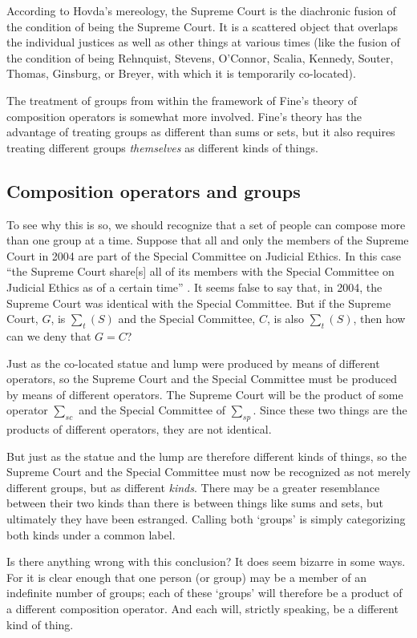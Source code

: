 \documentclass[11pt]{article}
\begin{document}
\begin{spacing}{1.5}
According to Hovda's mereology, the Supreme Court is the diachronic
fusion of the condition of being the Supreme Court.  It is a scattered
object that overlaps the individual justices as well as other things
at various times (like the fusion of the condition of being Rehnquist,
Stevens, O'Connor, Scalia, Kennedy, Souter, Thomas, Ginsburg, or
Breyer, with which it is temporarily co-located).

The treatment of groups from within the framework of Fine's theory of
composition operators is somewhat more involved.  Fine's theory has
the advantage of treating groups as different than sums or sets, but
it also requires treating different groups {\em themselves} as
different kinds of things.

\subsection{Composition operators and groups}
\label{group-fine}
To see why this is so, we should recognize that a set of people can
compose more than one group at a time.  Suppose that all and only the
members of the Supreme Court in 2004 are part of the Special Committee
on Judicial Ethics.  In this case ``the Supreme Court share[s] all of
its members with the Special Committee on Judicial Ethics as of a
certain time'' \citep[151]{uzquiano2004a}.  It seems false to say
that, in 2004, the Supreme Court was identical with the Special
Committee.  But if the Supreme Court, $G$, is $\sum _{t} ( S )$ and
the Special Committee, $C$, is also $\sum _{t} ( S )$, then how can we
deny that $G = C$?

Just as the co-located statue and lump were produced by means of
different operators, so the Supreme Court and the Special Committee
must be produced by means of different operators.  The Supreme Court
will be the product of some operator $\sum _{sc}$ and the Special
Committee of $\sum _{sp}$.  Since these two things are the products of
different operators, they are not identical.

But just as the statue and the lump are therefore different kinds of
things, so the Supreme Court and the Special Committee must now be
recognized as not merely different groups, but as different {\em
  kinds}.  There may be a greater resemblance between their two kinds
than there is between things like sums and sets, but ultimately they
have been estranged.  Calling both `groups' is simply categorizing
both kinds under a common label.

Is there anything wrong with this conclusion?  It does seem bizarre in
some ways.  For it is clear enough that one person (or group) may be a
member of an indefinite number of groups; each of these `groups' will
therefore be a product of a different composition operator.  And each
will, strictly speaking, be a different kind of thing.


\end{spacing}
\end{document}

